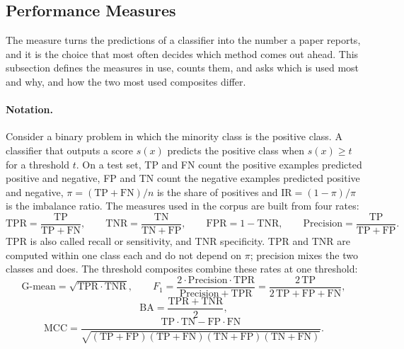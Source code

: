\subsection{Performance Measures}
\label{sec:empirical-measures-in-use}

The measure turns the predictions of a classifier into the number a paper reports, and it is the choice that most often decides which method comes out ahead. This subsection defines the measures in use, counts them, and asks which is used most and why, and how the two most used composites differ.

\paragraph{Notation.} Consider a binary problem in which the minority class is the positive class. A classifier that outputs a score $s(x)$ predicts the positive class when $s(x) \ge t$ for a threshold $t$. On a test set, TP and FN count the positive examples predicted positive and negative, FP and TN count the negative examples predicted positive and negative, $\pi = (\mathrm{TP} + \mathrm{FN}) / n$ is the share of positives and $\mathrm{IR} = (1 - \pi) / \pi$ is the imbalance ratio. The measures used in the corpus are built from four rates:
\begin{equation}
  \mathrm{TPR} = \frac{\mathrm{TP}}{\mathrm{TP} + \mathrm{FN}}, \qquad
  \mathrm{TNR} = \frac{\mathrm{TN}}{\mathrm{TN} + \mathrm{FP}}, \qquad
  \mathrm{FPR} = 1 - \mathrm{TNR}, \qquad
  \mathrm{Precision} = \frac{\mathrm{TP}}{\mathrm{TP} + \mathrm{FP}}.
  \label{eq:empirical-rates}
\end{equation}
TPR is also called recall or sensitivity, and TNR specificity. TPR and TNR are computed within one class each and do not depend on $\pi$; precision mixes the two classes and does. The threshold composites combine these rates at one threshold:
\begin{equation}
  \text{G-mean} = \sqrt{\mathrm{TPR} \cdot \mathrm{TNR}}, \qquad
  F_1 = \frac{2 \cdot \mathrm{Precision} \cdot \mathrm{TPR}}{\mathrm{Precision} + \mathrm{TPR}} = \frac{2\,\mathrm{TP}}{2\,\mathrm{TP} + \mathrm{FP} + \mathrm{FN}},
  \label{eq:empirical-composites}
\end{equation}
\begin{equation}
  \mathrm{BA} = \frac{\mathrm{TPR} + \mathrm{TNR}}{2},
  \label{eq:empirical-ba}
\end{equation}
\begin{equation}
  \mathrm{MCC} = \frac{\mathrm{TP} \cdot \mathrm{TN} - \mathrm{FP} \cdot \mathrm{FN}}{\sqrt{(\mathrm{TP} + \mathrm{FP})(\mathrm{TP} + \mathrm{FN})(\mathrm{TN} + \mathrm{FP})(\mathrm{TN} + \mathrm{FN})}}.
  \label{eq:empirical-mcc}
\end{equation}
